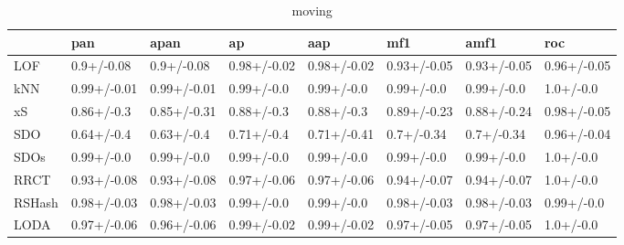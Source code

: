 \begin{table}
\centering
\caption{moving}
\begin{tabular}{llllllll}
\toprule
{} &          pan &         apan &           ap &          aap &          mf1 &         amf1 &          roc \\
\midrule
LOF    &   0.9+/-0.08 &   0.9+/-0.08 &  0.98+/-0.02 &  0.98+/-0.02 &  0.93+/-0.05 &  0.93+/-0.05 &  0.96+/-0.05 \\
kNN    &  0.99+/-0.01 &  0.99+/-0.01 &   0.99+/-0.0 &   0.99+/-0.0 &   0.99+/-0.0 &   0.99+/-0.0 &    1.0+/-0.0 \\
xS     &   0.86+/-0.3 &  0.85+/-0.31 &   0.88+/-0.3 &   0.88+/-0.3 &  0.89+/-0.23 &  0.88+/-0.24 &  0.98+/-0.05 \\
SDO    &   0.64+/-0.4 &   0.63+/-0.4 &   0.71+/-0.4 &  0.71+/-0.41 &   0.7+/-0.34 &   0.7+/-0.34 &  0.96+/-0.04 \\
SDOs   &   0.99+/-0.0 &   0.99+/-0.0 &   0.99+/-0.0 &   0.99+/-0.0 &   0.99+/-0.0 &   0.99+/-0.0 &    1.0+/-0.0 \\
RRCT   &  0.93+/-0.08 &  0.93+/-0.08 &  0.97+/-0.06 &  0.97+/-0.06 &  0.94+/-0.07 &  0.94+/-0.07 &    1.0+/-0.0 \\
RSHash &  0.98+/-0.03 &  0.98+/-0.03 &   0.99+/-0.0 &   0.99+/-0.0 &  0.98+/-0.03 &  0.98+/-0.03 &   0.99+/-0.0 \\
LODA   &  0.97+/-0.06 &  0.96+/-0.06 &  0.99+/-0.02 &  0.99+/-0.02 &  0.97+/-0.05 &  0.97+/-0.05 &    1.0+/-0.0 \\
\bottomrule
\end{tabular}
\end{table}
